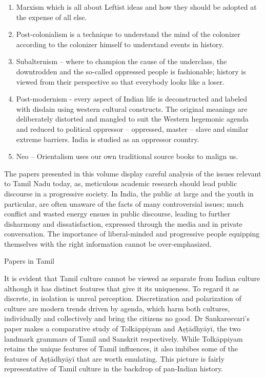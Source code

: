 \begin{enumerate}[{\rm 1)}]
\itemsep=0pt
\item Marxism which is all about Leftist ideas and how they should be adopted at the expense of all else.

 \item Post-colonialism is a technique to understand the mind of the colonizer according to the colonizer himself to understand events in history.

 \item Subalternism – where to champion the cause of the underclass, the downtrodden and the so-called oppressed people is fashionable; history is viewed from their perspective so that everybody looks like a loser. 

 \item Post-modernism - every aspect of Indian life is deconstructed and labeled with disdain using western cultural constructs. The original meanings are deliberately distorted and mangled to suit the Western hegemonic agenda and reduced to political oppressor – oppressed, master – slave and similar extreme barriers. India is studied as an oppressor country.

 \item Neo – Orientalism uses our own traditional source books to malign us.

\end{enumerate}

The papers presented in this volume display careful analysis of the issues relevant to Tamil Nadu today, as, meticulous academic research should lead public discourse in a progressive society. In India, the public at large and the youth in particular, are often unaware of the facts of many controversial issues; much conflict and wasted energy ensues in public discourse, leading to further disharmony and dissatisfaction, expressed through the media and in private conversation. The importance of liberal-minded and progressive people equipping themselves with the right information cannot be over-emphasized.

Papers in Tamil

It is evident that Tamil culture cannot be viewed as separate from Indian culture although it has distinct features that give it its uniqueness. To regard it as discrete, in isolation is unreal perception. Discretization and polarization of culture are modern trends driven by agenda, which harm both cultures, individually and collectively and bring the citizens no good. Dr Sankaresvari’s paper makes a comparative study of Tolkāppiyam and Aṣṭādhyāyī, the two landmark grammars of Tamil and Sanskrit respectively. While Tolkāppiyam retains the unique features of Tamil influences, it also imbibes some of the features of Aṣṭādhyāyī that are worth emulating. This picture is fairly representative of Tamil culture in the backdrop of pan-Indian history.

